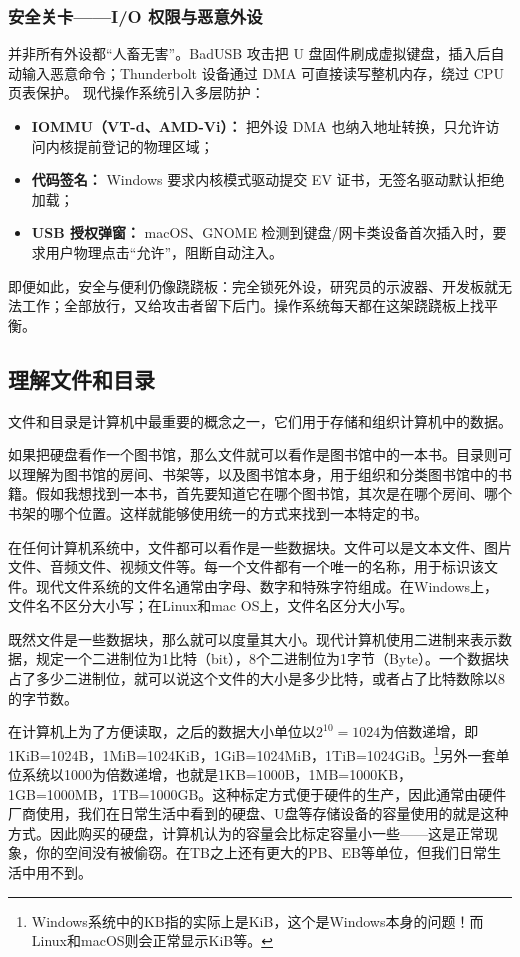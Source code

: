 \subsubsection{安全关卡——I/O 权限与恶意外设}
并非所有外设都“人畜无害”。BadUSB 攻击把 U 盘固件刷成虚拟键盘，插入后自动输入恶意命令；Thunderbolt 设备通过 DMA 可直接读写整机内存，绕过 CPU 页表保护。
现代操作系统引入多层防护：
\begin{itemize}
\item \textbf{IOMMU（VT-d、AMD-Vi）：} 把外设 DMA 也纳入地址转换，只允许访问内核提前登记的物理区域；
\item \textbf{代码签名：} Windows 要求内核模式驱动提交 EV 证书，无签名驱动默认拒绝加载；
\item \textbf{USB 授权弹窗：} macOS、GNOME 检测到键盘/网卡类设备首次插入时，要求用户物理点击“允许”，阻断自动注入。
\end{itemize}
即便如此，安全与便利仍像跷跷板：完全锁死外设，研究员的示波器、开发板就无法工作；全部放行，又给攻击者留下后门。操作系统每天都在这架跷跷板上找平衡。

\subsection{理解文件和目录}

文件和目录是计算机中最重要的概念之一，它们用于存储和组织计算机中的数据。

如果把硬盘看作一个图书馆，那么文件就可以看作是图书馆中的一本书。目录则可以理解为图书馆的房间、书架等，以及图书馆本身，用于组织和分类图书馆中的书籍。假如我想找到一本书，首先要知道它在哪个图书馆，其次是在哪个房间、哪个书架的哪个位置。这样就能够使用统一的方式来找到一本特定的书。

在任何计算机系统中，文件都可以看作是一些数据块。文件可以是文本文件、图片文件、音频文件、视频文件等。每一个文件都有一个唯一的名称，用于标识该文件。现代文件系统的文件名通常由字母、数字和特殊字符组成。在Windows上，文件名不区分大小写；在Linux和mac OS上，文件名区分大小写。

既然文件是一些数据块，那么就可以度量其大小。现代计算机使用二进制来表示数据，规定一个二进制位为1比特（bit），8个二进制位为1字节（Byte）。一个数据块占了多少二进制位，就可以说这个文件的大小是多少比特，或者占了比特数除以8的字节数。

在计算机上为了方便读取，之后的数据大小单位以$2^{10}=1024$为倍数递增，即1KiB=1024B，1MiB=1024KiB，1GiB=1024MiB，1TiB=1024GiB。\footnote{Windows系统中的KB指的实际上是KiB，这个是Windows本身的问题！而Linux和macOS则会正常显示KiB等。}另外一套单位系统以1000为倍数递增，也就是1KB=1000B，1MB=1000KB，1GB=1000MB，1TB=1000GB。这种标定方式便于硬件的生产，因此通常由硬件厂商使用，我们在日常生活中看到的硬盘、U盘等存储设备的容量使用的就是这种方式。因此购买的硬盘，计算机认为的容量会比标定容量小一些——这是正常现象，你的空间没有被偷窃。在TB之上还有更大的PB、EB等单位，但我们日常生活中用不到。

